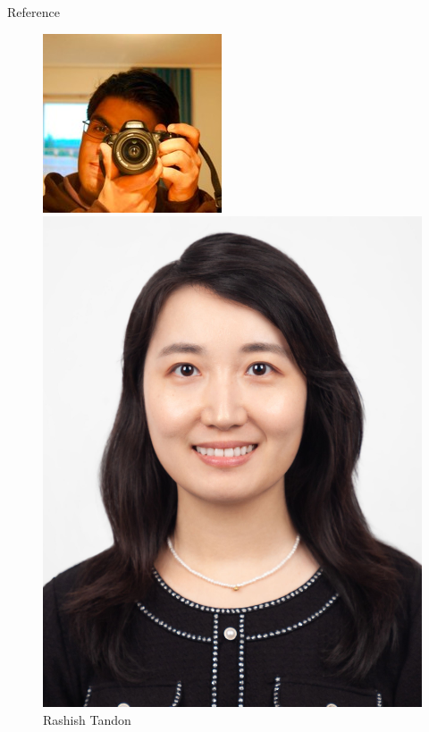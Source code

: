 \documentclass{beamer}
\begin{document}
\begin{frame}{Reference}
\begin{figure}
    \centering
    \begin{minipage}[t]{.2\paperwidth}
        \centering
        \includegraphics[width=\textwidth]{res/Rashish Tandon.jpg}
        \caption{Rashish Tandon}
    \end{minipage}
    \begin{minipage}[t]{.2\paperwidth}
        \centering
        \includegraphics[width=\textwidth]{res/Qi Lei.jpg}

\end{minipage}
\end{figure}
\end{frame}
\end{document}

